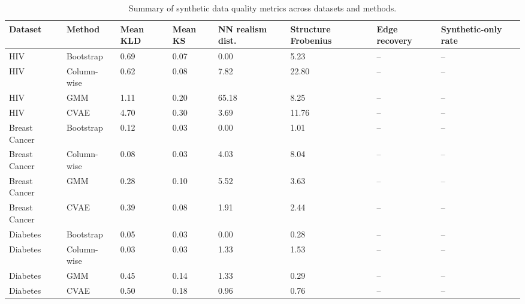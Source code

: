 \begin{table}
\caption{Summary of synthetic data quality metrics across datasets and methods.}
\label{tab:supp_metric_summary}
\begin{tabular}{llllllll}
\toprule
Dataset & Method & Mean KLD & Mean KS & NN realism dist. & Structure Frobenius & Edge recovery & Synthetic-only rate \\
\midrule
HIV & Bootstrap & 0.69 & 0.07 & 0.00 & 5.23 & -- & -- \\
HIV & Column-wise & 0.62 & 0.08 & 7.82 & 22.80 & -- & -- \\
HIV & GMM & 1.11 & 0.20 & 65.18 & 8.25 & -- & -- \\
HIV & CVAE & 4.70 & 0.30 & 3.69 & 11.76 & -- & -- \\
Breast Cancer & Bootstrap & 0.12 & 0.03 & 0.00 & 1.01 & -- & -- \\
Breast Cancer & Column-wise & 0.08 & 0.03 & 4.03 & 8.04 & -- & -- \\
Breast Cancer & GMM & 0.28 & 0.10 & 5.52 & 3.63 & -- & -- \\
Breast Cancer & CVAE & 0.39 & 0.08 & 1.91 & 2.44 & -- & -- \\
Diabetes & Bootstrap & 0.05 & 0.03 & 0.00 & 0.28 & -- & -- \\
Diabetes & Column-wise & 0.03 & 0.03 & 1.33 & 1.53 & -- & -- \\
Diabetes & GMM & 0.45 & 0.14 & 1.33 & 0.29 & -- & -- \\
Diabetes & CVAE & 0.50 & 0.18 & 0.96 & 0.76 & -- & -- \\
\bottomrule
\end{tabular}
\end{table}
